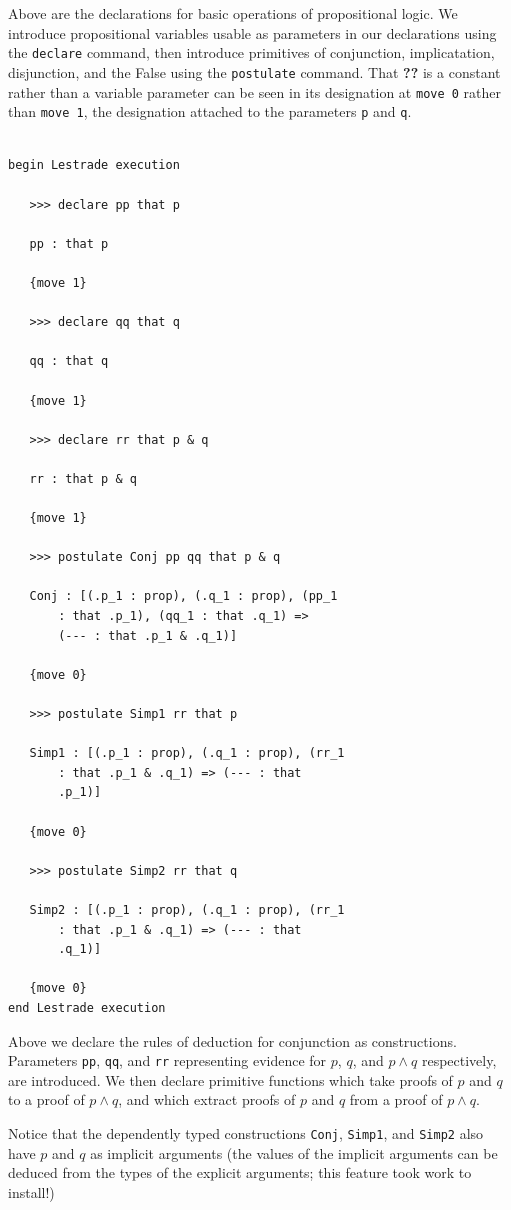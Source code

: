 \documentclass[12pt]{article}
\begin{document}
Above are the declarations for basic operations of propositional logic.  We introduce propositional variables usable as parameters in our declarations using the {\tt declare\/} command, then
introduce primitives of conjunction, implicatation, disjunction, and the False using the {\tt postulate\/} command.  That {\bf ??} is a constant rather than a variable parameter
can be seen in its designation at {\tt move 0\/} rather than {\tt move 1\/}, the designation attached to the parameters {\tt p} and {\tt q\/}.

\begin{verbatim}

begin Lestrade execution

   >>> declare pp that p

   pp : that p

   {move 1}

   >>> declare qq that q

   qq : that q

   {move 1}

   >>> declare rr that p & q

   rr : that p & q

   {move 1}

   >>> postulate Conj pp qq that p & q

   Conj : [(.p_1 : prop), (.q_1 : prop), (pp_1 
       : that .p_1), (qq_1 : that .q_1) => 
       (--- : that .p_1 & .q_1)]

   {move 0}

   >>> postulate Simp1 rr that p

   Simp1 : [(.p_1 : prop), (.q_1 : prop), (rr_1 
       : that .p_1 & .q_1) => (--- : that 
       .p_1)]

   {move 0}

   >>> postulate Simp2 rr that q

   Simp2 : [(.p_1 : prop), (.q_1 : prop), (rr_1 
       : that .p_1 & .q_1) => (--- : that 
       .q_1)]

   {move 0}
end Lestrade execution
\end{verbatim}

Above we declare the rules of deduction for conjunction as constructions.   Parameters {\tt pp}, {\tt qq}, and {\tt rr} representing evidence for $p$, $q$, and $p \wedge q$ respectively, are introduced.  We then declare primitive functions which take proofs of $p$ and $q$ to a proof of $p \wedge q$, and which extract proofs of $p$ and $q$ from a proof of $p \wedge q$.

Notice that the dependently typed constructions {\tt Conj}, {\tt Simp1}, and {\tt Simp2} also have $p$ and $q$ as implicit arguments (the values of the implicit arguments can be deduced from the types of the explicit arguments;  this feature took work to install!)
\end{document}
